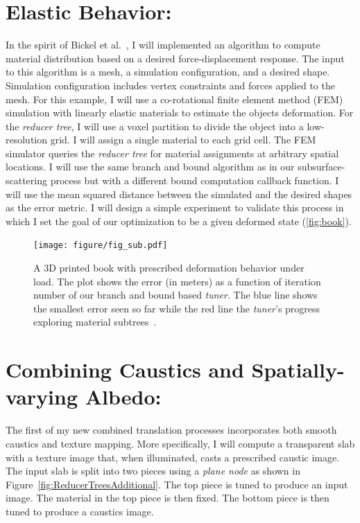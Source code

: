 \section{Elastic Behavior:}
In the spirit of Bickel et al.~, I will implemented an algorithm to compute material distribution based on a desired force-displacement response.
The input to this algorithm is a mesh, a simulation configuration, and a desired shape.
Simulation configuration includes vertex constraints and forces applied to the mesh.
For this example, I will use a co-rotational finite element method (FEM) simulation with linearly elastic materials to estimate the objects deformation.
For the \emph{reducer tree}, I will use a voxel partition to divide the object into a low-resolution grid.
I will assign a single material to each grid cell.
The FEM simulator queries the \emph{reducer tree} for material assignments at arbitrary spatial locations.
I will use the same branch and bound algorithm as in our subsurface-scattering process but with a different bound computation callback function.
I will use the mean squared distance between the simulated and the desired shapes as the error metric.
I will design a simple experiment to validate this process in which I set the goal of our optimization to be a given deformed state (\autoref{fig:book}).

\begin{figure}
\centering
\texttt{[image: figure/fig\_sub.pdf]}
\caption {A 3D printed book with prescribed deformation behavior under load.
The plot shows the error (in meters) as a function of iteration number of our branch and bound based \emph{tuner}.
The blue line shows the smallest error seen so far while the red line the \emph{tuner}'s progress exploring material subtrees~\protect\cite{Bickel:2009}.}
\label{fig:book}
\end{figure}

\section{Combining Caustics and Spatially-varying Albedo:}
The first of my new combined translation processes incorporates both smooth caustics and texture mapping.
More specifically, I will compute a transparent slab with a texture image that, when illuminated, casts a prescribed caustic image.
The input slab is split into two pieces using a \emph{plane node} as shown in Figure~\ref{fig:ReducerTreesAdditional}.
The top piece is tuned to produce an input image. The material in the top piece is then fixed. The bottom piece is then tuned to produce a caustics image.


